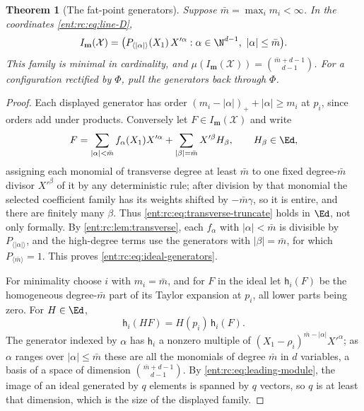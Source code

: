 \documentclass[11pt]{article}
\newtheorem{theorem}{Theorem}[section]
\theoremstyle{plain}
\theoremstyle{plain}
\theoremstyle{plain}
\theoremstyle{definition}
\theoremstyle{definition}
\theoremstyle{definition}
\theoremstyle{definition}
\theoremstyle{remark}
\begin{document}
\begin{theorem}[The fat-point generators]\label{ent:rc:thm:fat-generators}
Suppose $\bar m=\max_im_i<\infty$. In the coordinates \eqref{ent:rc:eq:line-D},
\begin{equation}\label{ent:rc:eq:ideal-generators}
 I_{\mathbf m}(\mathcal X)=\bigl(P_{\langle|\alpha|\rangle}(X_1)\,X'^\alpha:
 \alpha\in\N^{d-1},\ |\alpha|\le\bar m\bigr).
\end{equation}
This family is minimal in cardinality, and
$\mu(I_{\mathbf m}(\mathcal X))=\binom{\bar m+d-1}{d-1}$. For a configuration
rectified by $\Phi$, pull the generators back through $\Phi$.
\end{theorem}
\begin{proof}
Each displayed generator has order $(m_i-|\alpha|)_++|\alpha|\ge m_i$ at
$p_i$, since orders add under products. Conversely let $F\in
I_{\mathbf m}(\mathcal X)$ and write
\begin{equation}\label{ent:rc:eq:transverse-truncate}
 F=\sum_{|\alpha|<\bar m}f_\alpha(X_1)X'^\alpha
 +\sum_{|\beta|=\bar m}X'^\beta H_\beta,\qquad H_\beta\in\Ed ,
\end{equation}
assigning each monomial of transverse degree at least $\bar m$ to one fixed
degree-$\bar m$ divisor $X'^\beta$ of it by any deterministic rule; after
division by that monomial the selected coefficient family has its weights
shifted by $-\bar m\gamma$, so it is entire, and there are finitely many
$\beta$. Thus \eqref{ent:rc:eq:transverse-truncate} holds in $\Ed$, not only
formally. By \cref{ent:rc:lem:transverse}, each $f_\alpha$ with
$|\alpha|<\bar m$ is divisible by $P_{\langle|\alpha|\rangle}$, and the
high-degree terms use the generators with $|\beta|=\bar m$, for which
$P_{\langle\bar m\rangle}=1$. This proves \eqref{ent:rc:eq:ideal-generators}.

For minimality choose $i$ with $m_i=\bar m$, and for $F$ in the ideal let
$\mathsf h_i(F)$ be the homogeneous degree-$\bar m$ part of its Taylor
expansion at $p_i$, all lower parts being zero. For $H\in\Ed$,
\begin{equation}\label{ent:rc:eq:leading-module}
 \mathsf h_i(HF)=H(p_i)\,\mathsf h_i(F).
\end{equation}
The generator indexed by $\alpha$ has $\mathsf h_i$ a nonzero multiple of
$(X_1-\rho_i)^{\bar m-|\alpha|}X'^\alpha$; as $\alpha$ ranges over
$|\alpha|\le\bar m$ these are all the monomials of degree $\bar m$ in $d$
variables, a basis of a space of dimension $\binom{\bar m+d-1}{d-1}$. By
\eqref{ent:rc:eq:leading-module}, the image of an ideal generated by $q$
elements is spanned by $q$ vectors, so $q$ is at least that dimension, which is
the size of the displayed family.
\end{proof}
\end{document}
